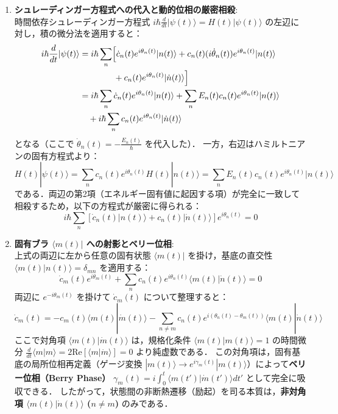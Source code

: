 \documentclass[11pt,a4paper,oneside,openany]{ltjsbook}
\theoremstyle{definition}
\theoremstyle{plain}
\theoremstyle{remark}
\newcommand{\ket}[1]{|#1\rangle}
\newcommand{\bra}[1]{\langle#1|}
\newcommand{\braket}[2]{\langle#1|#2\rangle}
\begin{document}
\begin{insightbox}
\begin{enumerate}[label=\textbf{Step \arabic* :}, leftmargin=*]
    \item \textbf{シュレーディンガー方程式への代入と動的位相の厳密相殺}:\\
    時間依存シュレーディンガー方程式 $i\hbar \frac{d}{dt}\ket{\psi(t)} = H(t)\ket{\psi(t)}$ の左辺に対し，積の微分法を適用すると：
    \begin{align}
        i\hbar \frac{d}{dt}\ket{\psi(t)} &= i\hbar \sum_n \Bigl[ \dot{c}_n(t) e^{i\theta_n(t)} \ket{n(t)} + c_n(t) (i \dot{\theta}_n(t)) e^{i\theta_n(t)} \ket{n(t)} \nonumber \\
        &\qquad\qquad + c_n(t) e^{i\theta_n(t)} \ket{\dot{n}(t)} \Bigr] \nonumber \\
        &= i\hbar \sum_n \dot{c}_n(t) e^{i\theta_n(t)} \ket{n(t)} + \sum_n E_n(t) c_n(t) e^{i\theta_n(t)} \ket{n(t)} \nonumber \\
        &\quad + i\hbar \sum_n c_n(t) e^{i\theta_n(t)} \ket{\dot{n}(t)}
    \end{align}
    となる（ここで $\dot{\theta}_n(t) = -\frac{E_n(t)}{\hbar}$ を代入した）．
    一方，右辺はハミルトニアンの固有方程式より：
    \begin{equation}
        H(t) \ket{\psi(t)} = \sum_n c_n(t) e^{i\theta_n(t)} H(t)\ket{n(t)} = \sum_n E_n(t) c_n(t) e^{i\theta_n(t)} \ket{n(t)}
    \end{equation}
    である．両辺の第2項（エネルギー固有値に起因する項）が完全に一致して相殺するため，以下の方程式が厳密に得られる：
    \begin{equation}
        i\hbar \sum_n \left[ \dot{c}_n(t) \ket{n(t)} + c_n(t) \ket{\dot{n}(t)} \right] e^{i\theta_n(t)} = 0
    \end{equation}

    \item \textbf{固有ブラ $\bra{m(t)}$ への射影とベリー位相}:\\
    上式の両辺に左から任意の固有状態 $\bra{m(t)}$ を掛け，基底の直交性 $\braket{m(t)}{n(t)} = \delta_{mn}$ を適用する：
    \begin{equation}
        \dot{c}_m(t) e^{i\theta_m(t)} + \sum_n c_n(t) e^{i\theta_n(t)} \braket{m(t)}{\dot{n}(t)} = 0
    \end{equation}
    両辺に $e^{-i\theta_m(t)}$ を掛けて $\dot{c}_m(t)$ について整理すると：
    \begin{equation}
        \dot{c}_m(t) = - c_m(t) \braket{m(t)}{\dot{m}(t)} - \sum_{n \neq m} c_n(t) e^{i(\theta_n(t) - \theta_m(t))} \braket{m(t)}{\dot{n}(t)}
    \end{equation}
    ここで対角項 $\braket{m(t)}{\dot{m}(t)}$ は，規格化条件 $\braket{m(t)}{m(t)}=1$ の時間微分 $\frac{d}{dt}\braket{m}{m} = 2\text{Re}[\braket{m}{\dot{m}}] = 0$ より純虚数である．
    この対角項は，固有基底の局所位相再定義（ゲージ変換 $\ket{m(t)} \to e^{i\gamma_m(t)}\ket{m(t)}$）によって\textbf{ベリー位相（Berry Phase）}\cite{berry1984quantal} $\gamma_m(t) = i \int_0^t \braket{m(t')}{\dot{m}(t')}dt'$ として完全に吸収できる．
    したがって，状態間の非断熱遷移（励起）を司る本質は，\textbf{非対角項 $\braket{m(t)}{\dot{n}(t)}$ ($n \neq m$)} のみである．


\end{enumerate}
\end{insightbox}
\end{document}

